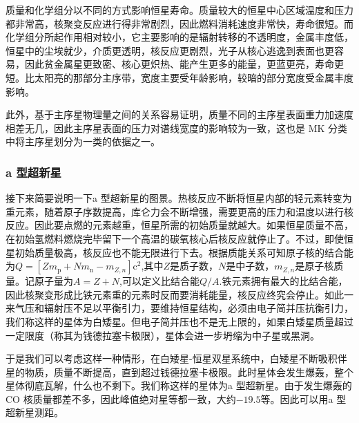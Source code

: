 \documentclass[../天体物理基础.tex]{subfiles}
\begin{document}
质量和化学组分以不同的方式影响恒星寿命。质量较大的恒星中心区域温度和压力都非常高，核聚变反应进行得非常剧烈，因此燃料消耗速度非常快，寿命很短。而化学组分所起作用相对较小，它主要影响的是辐射转移的不透明度，金属丰度低，恒星中的尘埃就少，介质更透明，核反应更剧烈，光子从核心逃逸到表面也更容易，因此贫金属星更致密、核心更炽热、能产生更多的能量，更蓝更亮，寿命更短。比太阳亮的那部分主序带，宽度主要受年龄影响，较暗的部分宽度受金属丰度影响。

此外，基于主序星物理量之间的关系容易证明，质量不同的主序星表面重力加速度相差无几，因此主序星表面的压力对谱线宽度的影响较为一致，这也是 MK 分类中将主序星划分为一类的依据之一。

\subsubsection{\uppercase\expandafter{}a 型超新星}
接下来简要说明一下\uppercase\expandafter{}a 型超新星的图景。热核反应不断将恒星内部的轻元素转变为重元素，随着原子序数提高，库仑力会不断增强，需要更高的压力和温度以进行核反应。因此要点燃的元素越重，恒星所需的初始质量就越大。如果恒星质量不高，在初始氢燃料燃烧完毕留下一个高温的碳氧核心后核反应就停止了。不过，即使恒星初始质量极高，核反应也不能无限进行下去。根据质能关系可知原子核的结合能为$Q=\left[Zm_{\text{p}}+Nm_{\text{n}}-m_{Z,n}\right]\mathrm{c}^{2}$,其中$Z$是质子数，$N$是中子数，$m_{Z,n}$是原子核质量。记原子量为$A=Z+N$,可以定义比结合能$Q/A$.铁元素拥有最大的比结合能，因此核聚变形成比铁元素重的元素时反而要消耗能量，核反应终究会停止。如此一来气压和辐射压不足以平衡引力，要维持恒星结构，必须由电子简并压抗衡引力，我们称这样的星体为白矮星。但电子简并压也不是无上限的，如果白矮星质量超过一定限度（称其为钱德拉塞卡极限），星体会进一步坍缩为中子星或黑洞。

于是我们可以考虑这样一种情形，在白矮星{}-{}恒星双星系统中，白矮星不断吸积伴星的物质，质量不断提高，直到超过钱德拉塞卡极限。此时星体会发生爆轰，整个星体彻底瓦解，什么也不剩下。我们称这样的星体为\uppercase\expandafter{}a 型超新星。由于发生爆轰的 CO 核质量都差不多，因此峰值绝对星等都一致，大约$-19.5$等。因此可以用\uppercase\expandafter{}a 型超新星测距。
\end{document}
